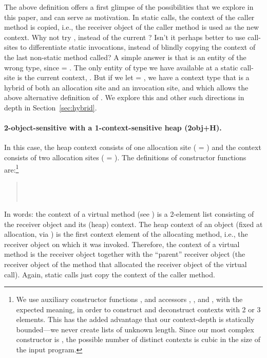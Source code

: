 The above definition offers a first glimpse of the possibilities that
we explore in this paper, and can serve as motivation. In static
calls, the context of the caller method is copied, i.e., the receiver
object of the caller method is used as the new context. Why not try
, instead of the current
?  Isn't it perhaps better to use
call-sites to differentiate static invocations, instead of blindly
copying the context of the last non-static method called? A simple
answer is that  is an entity of the wrong type, since
 = . The only entity of type  we have
available at a static call-site is the current context, .
But if we let  = , we have a context type
that is a hybrid of both an allocation site and an invocation site,
and which allows the above alternative definition of
. We explore this and other such directions in
depth in Section~\ref{sec:hybrid}.

\paragraph{2-object-sensitive with a 1-context-sensitive heap (2obj+H).}
In this case, the heap context consists of one allocation site
( = ) and the context consists of two allocation
sites ( = ). The definitions of constructor
functions are:\footnote{We use auxiliary constructor functions
,  and accessors ,
, and , with the expected meaning, in order
to construct and deconstruct contexts with 2 or 3 elements. This has
the added advantage that our context-depth is statically bounded---we
never create lists of unknown length. Since our most complex constructor
is , the possible number of distinct contexts is cubic in
the size of the input program.}
\begin{quote}
 \\
 \\
\end{quote}
In words: the context of a virtual method (see ) is a
2-element list consisting of the receiver object and its (heap)
context. The heap context of an object (fixed at allocation, via
) is the first context element of the allocating
method, i.e., the receiver object on which it was invoked. Therefore,
the context of a virtual method is the receiver object together with
the ``parent'' receiver object (the receiver object of the method that
allocated the receiver object of the virtual call). Again, static
calls just copy the context of the caller method.

